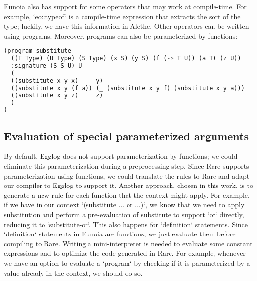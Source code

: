 \documentclass{article}
\begin{document}
Eunoia also has support for some operators that may work at compile-time. For example, `eo::typeof` is a compile-time expression that extracts the sort of the type; luckily, we have this information in Alethe. Other operators can be written using programs. Moreover, programs can also be parameterized by functions:

\begin{lstlisting}[language=Rust]
(program substitute
  ((T Type) (U Type) (S Type) (x S) (y S) (f (-> T U)) (a T) (z U))
  :signature (S S U) U
  (
  ((substitute x y x)     y)
  ((substitute x y (f a)) (_ (substitute x y f) (substitute x y a)))
  ((substitute x y z)     z)
  )
)
\end{lstlisting}

\subsection{Evaluation of special parameterized arguments}

By default, Egglog does not support parameterization by functions; we could eliminate this parameterization during a preprocessing step. Since Rare supports parameterization using functions, we could translate the rules to Rare and adapt our compiler to Egglog to support it. Another approach, chosen in this work, is to generate a new rule for each function that the context might apply. For example, if we have in our context `(substitute ... or ...)`, we know that we need to apply substitution and perform a pre-evaluation of substitute to support `or` directly, reducing it to `substitute-or`. This also happens for `definition` statements. Since `definition` statements in Eunoia are functions, we just evaluate them before compiling to Rare. Writing a mini-interpreter is needed to evaluate some constant expressions and to optimize the code generated in Rare. For example, whenever we have an option to evaluate a `program` by checking if it is parameterized by a value already in the context, we should do so. 



\end{document}
